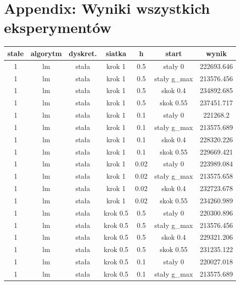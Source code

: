 \documentclass[11pt]{article}
\begin{document}
\section{Appendix: Wyniki wszystkich eksperymentów}
\begin{table}[h]
  \begin{center}
    \begin{tabular}{|c|c|c|c|c|c|c|}
      \hline
      stałe & algorytm & dyskret. & siatka & h & start & wynik\\
      \hline
      1 & lm & stała & krok 1 & 0.5 & stały 0 & 222693.646 \\
      \hline
      1 & lm & stała & krok 1 & 0.5 & stały g_max & 213576.456 \\
      \hline
      1 & lm & stała & krok 1 & 0.5 & skok 0.4 & 234892.685 \\
      \hline
      1 & lm & stała & krok 1 & 0.5 & skok 0.55 & 237451.717 \\
      \hline
      1 & lm & stała & krok 1 & 0.1 & stały 0 & 221268.2 \\
      \hline
      1 & lm & stała & krok 1 & 0.1 & stały g_max & 213575.689 \\
      \hline
      1 & lm & stała & krok 1 & 0.1 & skok 0.4 & 228320.226 \\
      \hline
      1 & lm & stała & krok 1 & 0.1 & skok 0.55 & 229669.421 \\
      \hline
      1 & lm & stała & krok 1 & 0.02 & stały 0 & 223989.084 \\
      \hline
      1 & lm & stała & krok 1 & 0.02 & stały g_max & 213575.658 \\
      \hline
      1 & lm & stała & krok 1 & 0.02 & skok 0.4 & 232723.678 \\
      \hline
      1 & lm & stała & krok 1 & 0.02 & skok 0.55 & 234260.989 \\
      \hline
      1 & lm & stała & krok 0.5 & 0.5 & stały 0 & 220300.896 \\
      \hline
      1 & lm & stała & krok 0.5 & 0.5 & stały g_max & 213576.456 \\
      \hline
      1 & lm & stała & krok 0.5 & 0.5 & skok 0.4 & 229321.206 \\
      \hline
      1 & lm & stała & krok 0.5 & 0.5 & skok 0.55 & 231235.122 \\
      \hline
      1 & lm & stała & krok 0.5 & 0.1 & stały 0 & 220027.018 \\
      \hline
      1 & lm & stała & krok 0.5 & 0.1 & stały g_max & 213575.689 \\

\end{tabular}
\end{center}
\end{table}
\end{document}
